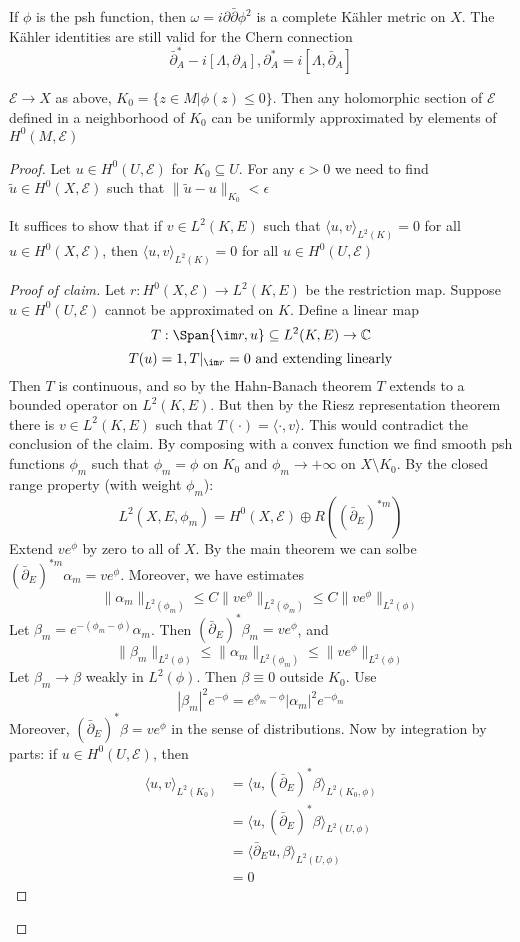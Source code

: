 \documentclass[../main.tex]{subfiles}
\begin{document}
If $\phi$ is the psh function, then $\omega=i\partial\bar\partial\phi^2$ is a complete K\"ahler metric on $X$. The K\"ahler identities are still valid for the Chern connection
\[\bar\partial_A^*-i[\Lambda,\partial_A],\partial_A^*=i[\Lambda,\bar\partial_A]\]

\begin{theorem}
$\mathcal E\to X$ as above, $K_0=\{z\in M|\phi(z)\leq0\}$. Then any holomorphic section of $\mathcal E$ defined in a neighborhood of $K_0$ can be uniformly approximated by elements of $H^0(M,\mathcal E)$
\end{theorem}

\begin{proof}
Let $u\in H^0(U,\mathcal E)$ for $K_0\subseteq U$. For any $\epsilon>0$ we need to find $\tilde u\in H^0(X,\mathcal E)$ such that $\|\tilde u-u\|_{K_0}<\epsilon$
\begin{claim}
It suffices to show that if $v\in L^2(K,E)$ such that $\langle u,v\rangle_{L^2(K)}=0$ for all $u\in H^0(X,\mathcal E)$, then $\langle u,v\rangle_{L^2(K)}=0$ for all $u\in H^0(U,\mathcal E)$
\end{claim}
\begin{proof}[Proof of claim]
Let $r:H^0(X,\mathcal E)\to L^2(K,E)$ be the restriction map. Suppose $u\in H^0(U,\mathcal E)$ cannot be approximated on $K$. Define a linear map
\[T:\Span\{\im r,u\}\subseteq L^2(K,E)\to\mathbb C\]
\[T(u)=1,T|_{\im r}=0\text{ and extending linearly}\]
Then $T$ is continuous, and so by the Hahn-Banach theorem $T$ extends to a bounded operator on $L^2(K,E)$. But then by the Riesz representation theorem there is $v\in L^2(K,E)$ such that $T(\cdot)=\langle\cdot,v\rangle$. This would contradict the conclusion of the claim. By composing with a convex function we find smooth psh functions $\phi_m$ such that $\phi_m=\phi$ on $K_0$ and $\phi_m\to+\infty$ on $X\setminus K_0$. By the closed range property (with weight $\phi_m$):
\[L^2(X,E,\phi_m)=H^0(X,\mathcal E)\oplus R((\bar\partial_E)^{*m})\]
Extend $ve^\phi$ by zero to all of $X$. By the main theorem we can solbe $(\bar\partial_E)^{*m}\alpha_m=ve^\phi$. Moreover, we have estimates
\[\|\alpha_m\|_{L^2(\phi_m)}\leq C\|ve^\phi\|_{L^2(\phi_m)}\leq C\|ve^\phi\|_{L^2(\phi)}\]
Let $\beta_m=e^{-(\phi_m-\phi)}\alpha_m$. Then $(\bar\partial_E)^*\beta_m=ve^\phi$, and
\[\|\beta_m\|_{L^2(\phi)}\leq\|\alpha_m\|_{L^2(\phi_m)}\leq\|ve^\phi\|_{L^2(\phi)}\]
Let $\beta_m\to\beta$ weakly in $L^2(\phi)$. Then $\beta\equiv0$ outside $K_0$. Use
\[|\beta_m|^2e^{-\phi}=e^{\phi_m-\phi}|\alpha_m|^2e^{-\phi_m}\]
Moreover, $(\bar\partial_E)^*\beta=ve^\phi$ in the sense of distributions. Now by integration by parts: if $u\in H^0(U,\mathcal E)$, then
\begin{align*}
\langle u,v\rangle_{L^2(K_0)}&=\langle u,(\bar\partial_E)^*\beta\rangle_{L^2(K_0,\phi)} \\
&=\langle u,(\bar\partial_E)^*\beta\rangle_{L^2(U,\phi)} \\
&=\langle \bar\partial_Eu,\beta\rangle_{L^2(U,\phi)} \\
&=0
\end{align*}
\end{proof}
\end{proof}
\end{document}
